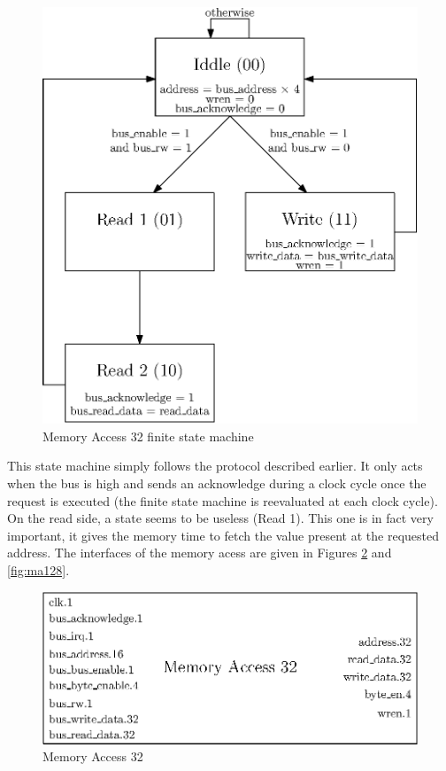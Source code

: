 \begin{figure}[ht!]
    \center
    \includegraphics[scale=0.8]{"Chapter6-MAU_CTRLU/res/mau_fsm"}
    \caption{Memory Access 32 finite state machine}
    \label{fig:ma_fsm}
\end{figure}

This state machine simply follows the protocol described earlier. It only acts when the bus is high 
and sends an acknowledge during a clock cycle once the request is executed (the finite state machine 
is reevaluated at each clock cycle). On the read side, a state seems to be useless (Read 1). This 
one is in fact very important, it gives the memory time to fetch the value present at the requested 
address. The interfaces of the memory acess are given in Figures \ref{fig:ma32} and \ref{fig:ma128}.

\begin{figure}[ht!]
    \center
    \includegraphics[scale=0.8]{"Chapter6-MAU_CTRLU/res/memory_access_32"}
    \caption{Memory Access 32}
    \label{fig:ma32}
\end{figure}

